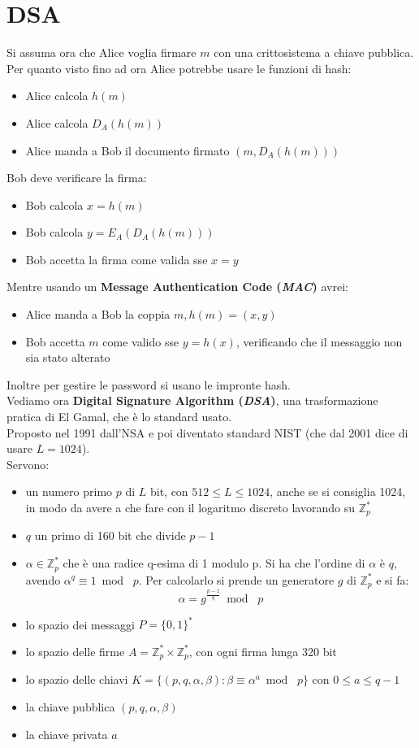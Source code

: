 \documentclass[a4paper,12pt, oneside]{book}
\begin{document}
\section{DSA}
Si assuma ora che Alice voglia firmare $m$ con una crittosistema a chiave
pubblica. Per quanto visto fino ad ora Alice potrebbe usare le funzioni di hash:
\begin{itemize}
  \item Alice calcola $h(m)$
  \item Alice calcola $D_A(h(m))$
  \item Alice manda a Bob il documento firmato $(m,D_A(h(m)))$
\end{itemize}
Bob deve verificare la firma:
\begin{itemize}
  \item Bob calcola $x=h(m)$
  \item Bob calcola $y=E_A(D_A(h(m)))$
  \item Bob accetta la firma come valida sse $x=y$
\end{itemize}
Mentre usando un \textbf{Message Authentication Code (\textit{MAC})} avrei:
\begin{itemize}
  \item Alice manda a Bob la coppia $m, h(m)=(x,y)$
  \item Bob accetta $m$ come valido sse $y=h(x)$, verificando che il messaggio
  non sia stato alterato
\end{itemize}
Inoltre per gestire le password si usano le impronte hash.\\
Vediamo ora \textbf{Digital Signature Algorithm (\textit{DSA})}, una
trasformazione pratica di El Gamal, che è lo standard usato.\\
Proposto nel 1991 dall'NSA e poi diventato standard NIST (che dal 2001 dice di
usare $L=1024$).\\
Servono:
\begin{itemize}
  \item un numero primo $p$ di $L$ bit, con $512\leq L\leq 1024$, anche se si
  consiglia 1024, in modo da avere a che fare con il logaritmo discreto
  lavorando su $\mathbb{Z}_p^*$
  \item $q$ un primo di 160 bit che divide $p-1$
  \item $\alpha\in\mathbb{Z}_p^*$ che è una radice q-esima di 1 modulo p. Si ha
  che l'ordine di $\alpha$ è $q$, avendo $\alpha^q\equiv 1\bmod\,\,p$. Per
  calcolarlo si prende un generatore $g$ di $\mathbb{Z}_p^*$ e si fa:
  \[\alpha=g^{\frac{p-1}{q}}\bmod\,\,p\]
  \item lo spazio dei messaggi $P=\{0,1\}^*$
  \item lo spazio delle firme $A=\mathbb{Z}_p^*\times \mathbb{Z}_p^*$, con ogni
  firma lunga 320 bit
  \item lo spazio delle chiavi
  $K=\{(p,q,\alpha,\beta):\beta\equiv\alpha^a\bmod\,\,p\}$ con $0\leq a \leq
  q-1$ 
  \item la chiave pubblica $(p,q,\alpha,\beta)$
  \item la chiave privata $a$
\end{itemize}
\end{document}
